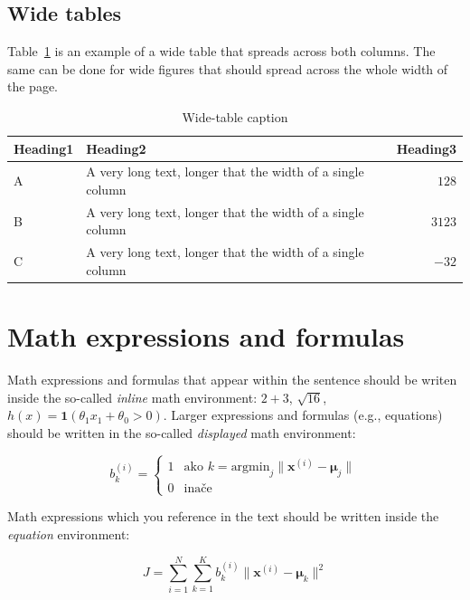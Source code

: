 \documentclass[10pt, a4paper]{article}
\begin{document}
\subsection{Wide tables}

Table~\ref{tab:wide-table} is an example of a wide table that spreads across both columns. The same can be done for wide figures that should spread across the whole width of the page. 

\begin{table}
\caption{Wide-table caption}
\label{tab:wide-table}
\begin{center}
\begin{tabular}{llr}
\toprule
Heading1 & Heading2 & Heading3\\
\midrule
A & A very long text, longer that the width of a single column & $128$\\
B & A very long text, longer that the width of a single column & $3123$\\
C & A very long text, longer that the width of a single column & $-32$\\
\bottomrule
\end{tabular}
\end{center}
\end{table}

\section{Math expressions and formulas}

Math expressions and formulas that appear within the sentence should be writen inside the so-called \emph{inline} math environment: $2+3$, $\sqrt{16}$, $h(x)=\mathbf{1}(\theta_1 x_1 + \theta_0>0)$. Larger expressions and formulas (e.g., equations) should be written in the so-called \emph{displayed} math environment:

\[
b^{(i)}_k = \begin{cases}
1 & \text{ako 
    $k = \text{argmin}_j \| \mathbf{x}^{(i)} - \mathbf{\mu}_j \|$}\\
0 & \text{inače}
\end{cases}
\]

Math expressions which you reference in the text should be written inside the \textit{equation} environment:

\begin{equation}\label{eq:kmeans-error}
J = \sum_{i=1}^N \sum_{k=1}^K 
b^{(i)}_k \| \mathbf{x}^{(i)} - \mathbf{\mu}_k \|^2
\end{equation}
\end{document}
